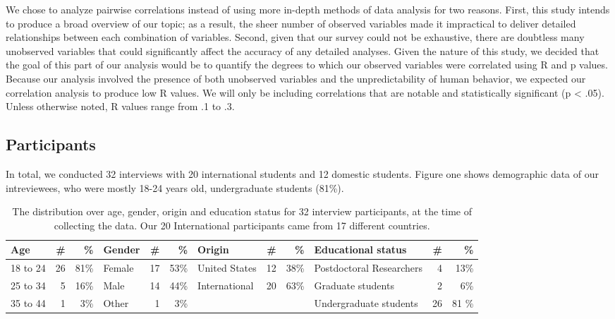 We chose to analyze pairwise correlations instead of using more in-depth
methods of data analysis for two reasons. First, this study intends to produce
a broad overview of our topic; as a result, the sheer number of observed
variables made it impractical to deliver detailed relationships between each
combination of variables. Second, given that our survey could not be
exhaustive, there are doubtless many unobserved variables that could
significantly affect the accuracy of any detailed analyses. Given the nature
of this study, we decided that the goal of this part of our analysis would be
to quantify the degrees to which our observed variables were correlated using
R and p values. Because our analysis involved the presence of both unobserved variables and
the unpredictability of human behavior, we expected our correlation analysis
to produce low R values. We will only be including correlations that are
notable and statistically significant (p < .05). Unless otherwise noted, R
values range from .1 to .3. 

\subsection{Participants} In total, we conducted 32 interviews with 20
international students and 12 domestic students. Figure one shows demographic data of our intreviewees, who were mostly 18-24 years old, undergraduate students (81\%).

\begin{table*}[h!]
\centering
\begin{tabular}{l r r |l r r|l r r|l r r} 
 \hline
 Age & \# & \% & Gender & \# & \% & Origin & \# & \% & Educational status & \# & \% \\
\hline
18 to 24 & 26 & 81\% & Female & 17 & 53\% & United States & 12 & 38\% & Postdoctoral Researchers & 4 & 13\% \\
25 to 34 & 5 & 16\% & Male & 14 & 44\% & International & 20 & 63\% & Graduate students & 2 & 6\% \\
35 to 44 & 1 & 3\% & Other & 1 & 3\% & & & & Undergraduate students & 26 & 81 \% \\
 \hline
\end{tabular}
\caption{The distribution over age, gender, origin and education status for 32 interview participants, at the time of collecting the data. Our 20 International participants came from 17 different countries.}
\label{table:1}
\end{table*}


